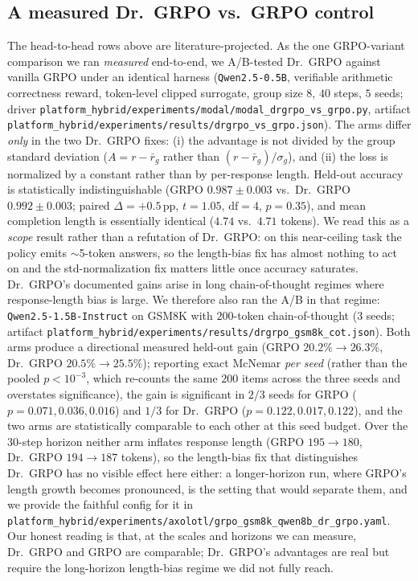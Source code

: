 \subsection{A measured Dr.\ GRPO vs.\ GRPO control}
\label{sec:variance-drgrpo}

The head-to-head rows above are literature-projected. As the one GRPO-variant
comparison we ran \emph{measured} end-to-end, we A/B-tested Dr.\ GRPO
\citep{tong2025drgrpo} against vanilla GRPO under an identical harness
(\texttt{Qwen2.5-0.5B}, verifiable arithmetic correctness reward, token-level
clipped surrogate, group size $8$, $40$ steps, $5$ seeds; driver
\texttt{platform_hybrid/experiments/modal/modal\_drgrpo\_vs\_grpo.py}, artifact
\texttt{platform_hybrid/experiments/results/drgrpo\_vs\_grpo.json}). The arms differ \emph{only}
in the two Dr.\ GRPO fixes: (i) the advantage is not divided by the group
standard deviation ($A = r - \bar r_g$ rather than $(r - \bar r_g)/\sigma_g$),
and (ii) the loss is normalized by a constant rather than by per-response
length. Held-out accuracy is statistically indistinguishable (GRPO
$0.987 \pm 0.003$ vs.\ Dr.\ GRPO $0.992 \pm 0.003$; paired
$\Delta = +0.5$\,pp, $t = 1.05$, $\mathrm{df}=4$, $p = 0.35$), and mean
completion length is essentially identical ($4.74$ vs.\ $4.71$ tokens).
We read this as a \emph{scope} result rather than a refutation of Dr.\ GRPO: on
this near-ceiling task the policy emits $\sim$5-token answers, so the
length-bias fix has almost nothing to act on and the std-normalization fix
matters little once accuracy saturates. Dr.\ GRPO's documented gains arise in
long chain-of-thought regimes where response-length bias is large. We therefore
also ran the A/B in that regime: \texttt{Qwen2.5-1.5B-Instruct} on GSM8K with
$200$-token chain-of-thought ($3$ seeds; artifact
\texttt{platform_hybrid/experiments/results/drgrpo\_gsm8k\_cot.json}). Both arms produce a
directional measured held-out gain (GRPO $20.2\% \to 26.3\%$, Dr.\ GRPO
$20.5\% \to 25.5\%$); reporting exact McNemar \emph{per seed} (rather than the
pooled $p<10^{-3}$, which re-counts the same $200$ items across the three seeds
and overstates significance), the gain is significant in $2/3$ seeds for GRPO
($p=0.071,0.036,0.016$) and $1/3$ for Dr.\ GRPO ($p=0.122,0.017,0.122$), and the
two arms are statistically comparable to each other at this seed budget. Over the $30$-step
horizon neither arm inflates response length (GRPO $195 \to 180$, Dr.\ GRPO
$194 \to 187$ tokens), so the length-bias fix that distinguishes Dr.\ GRPO has
no visible effect here either: a longer-horizon run, where GRPO's length growth
becomes pronounced, is the setting that would separate them, and we provide the
faithful config for it in
\texttt{platform_hybrid/experiments/axolotl/grpo\_gsm8k\_qwen8b\_dr\_grpo.yaml}. Our honest
reading is that, at the scales and horizons we can measure, Dr.\ GRPO and GRPO
are comparable; Dr.\ GRPO's advantages are real but require the long-horizon
length-bias regime we did not fully reach.

